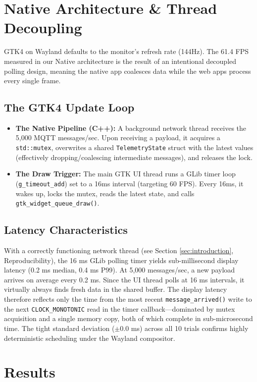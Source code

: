 \documentclass[lettersize,journal]{IEEEtran}
\begin{document}
\section{Native Architecture \& Thread Decoupling}

GTK4 on Wayland defaults to the monitor's refresh rate (144Hz). The 61.4 FPS measured in our Native architecture is the result of an intentional decoupled polling design, meaning the native app coalesces data while the web apps process every single frame.

\subsection{The GTK4 Update Loop}
\begin{itemize}
    \item \textbf{The Native Pipeline (C++):} A background network thread receives the 5,000 MQTT messages/sec. Upon receiving a payload, it acquires a \texttt{std::mutex}, overwrites a shared \texttt{TelemetryState} struct with the latest values (effectively dropping/coalescing intermediate messages), and releases the lock.
    \item \textbf{The Draw Trigger:} The main GTK UI thread runs a GLib timer loop (\texttt{g\_timeout\_add}) set to a 16ms interval (targeting 60 FPS). Every 16ms, it wakes up, locks the mutex, reads the latest state, and calls \texttt{gtk\_widget\_queue\_draw()}.
\end{itemize}

\subsection{Latency Characteristics}
With a correctly functioning network thread (see Section \ref{sec:introduction}, Reproducibility), the 16 ms GLib polling timer yields sub-millisecond display latency (0.2 ms median, 0.4 ms P99). At 5,000 messages/sec, a new payload arrives on average every 0.2 ms. Since the UI thread polls at 16 ms intervals, it virtually always finds fresh data in the shared buffer. The display latency therefore reflects only the time from the most recent \texttt{message\_arrived()} write to the next \texttt{CLOCK\_MONOTONIC} read in the timer callback—dominated by mutex acquisition and a single memory copy, both of which complete in sub-microsecond time. The tight standard deviation ($\pm 0.0$ ms) across all 10 trials confirms highly deterministic scheduling under the Wayland compositor.

\section{Results}
\end{document}
